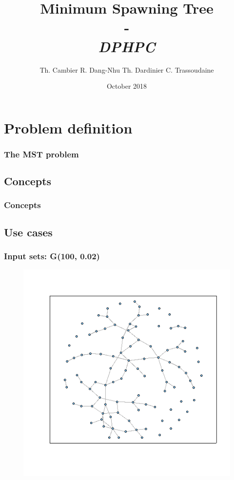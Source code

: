 \documentclass{beamer}
\institute[ETH Zürich]{\textbf{ETH Zürich}}
\date{October 2018}
\author{
    Th. Cambier
    R. Dang-Nhu
    Th. Dardinier
    C. Trassoudaine
}
\title{
	\textbf{Minimum Spawning Tree}\\
	-\\ 
	\textit{DPHPC}
}
\begin{document}

\frame{\titlepage}
\frame{\tableofcontents}



\section{Problem definition}
\begin{frame}
\frametitle{The MST problem}
\end{frame}

\subsection{Concepts}
\begin{frame}
\frametitle{Concepts}
\end{frame}

\subsection{Use cases}

\begin{frame}
\frametitle{Input sets: G(100, 0.02)}
\begin{figure}
 \includegraphics[width=.7\textwidth]{graphGNP.png}
\end{figure}
\end{frame}
\end{document}

